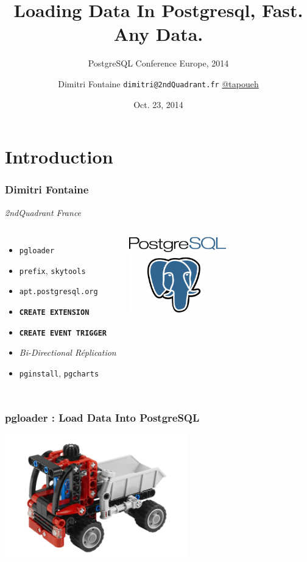 \documentclass{beamer}
\title{Loading Data In Postgresql, Fast. Any Data.}
\subtitle{PostgreSQL Conference Europe, 2014}
\author{Dimitri Fontaine \texttt{dimitri@2ndQuadrant.fr}
  \linebreak
  \url{@tapoueh}}
\date{Oct. 23, 2014}
\begin{document}
\frame{\titlepage}

\section{Introduction}

\begin{frame}[fragile]
  \frametitle{Dimitri Fontaine}

  \begin{center}
    \textit{2ndQuadrant France}
    \linebreak
  \end{center}

\begin{columns}[c]

  \begin{itemize}
   \item \texttt{pgloader}
   \item \texttt{prefix}, \texttt{skytools}
   \item \texttt{apt.postgresql.org}
   \item \texttt{\textbf{CREATE EXTENSION}}
   \item \texttt{\textbf{CREATE EVENT TRIGGER}}
   \item \textit{Bi-Directional Réplication}
   \item \texttt{pginstall}, \texttt{pgcharts}
  \end{itemize}  

\begin{center}
  \includegraphics[height=9em]{postgres-logo.png}
\end{center}
\end{columns}
\end{frame}

\begin{frame}
  \frametitle{pgloader : Load Data Into PostgreSQL}


  \begin{center}
    \includegraphics[height=2.1in]{pgloader.jpg}
  \end{center}
\end{frame}
\end{document}
